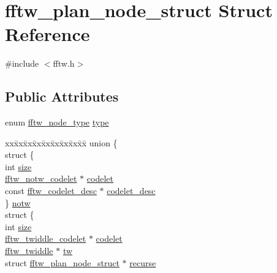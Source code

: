 \hypertarget{structfftw__plan__node__struct}{\section{fftw\-\_\-plan\-\_\-node\-\_\-struct Struct Reference}
\label{structfftw__plan__node__struct}
}


{\ttfamily \#include $<$fftw.\-h$>$}

\subsection*{Public Attributes}
\begin{DoxyCompactItemize}
\item 
enum \hyperlink{fftw_8h_a62ecac3f39269a2efca878ca819349f1}{fftw\-\_\-node\-\_\-type} \hyperlink{structfftw__plan__node__struct_a726e9ec82efd03cdc7b8be71c0c7225f}{type}
\item 
\begin{tabbing}
xx\=xx\=xx\=xx\=xx\=xx\=xx\=xx\=xx\=\kill
union \{\\
\>struct \{\\
\>\>int \hyperlink{structfftw__plan__node__struct_a334e1fcc2c98575d85d9a951b9e95941}{size}\\
\>\>\hyperlink{fftw_8h_a20c8a8b382f86bd89bf9c317cb95ec87}{fftw\_notw\_codelet} $\ast$ \hyperlink{structfftw__plan__node__struct_a25c03594d9b1cbb6233d09b3bc0af418}{codelet}\\
\>\>const \hyperlink{structfftw__codelet__desc}{fftw\_codelet\_desc} $\ast$ \hyperlink{structfftw__plan__node__struct_a7cb707dc27fb4779fbd0ee9cb4d7efd9}{codelet\_desc}\\
\>\} \hyperlink{structfftw__plan__node__struct_a1a913686c2edbeca067fff5c70838dd8}{notw}\\
\>struct \{\\
\>\>int \hyperlink{structfftw__plan__node__struct_a334e1fcc2c98575d85d9a951b9e95941}{size}\\
\>\>\hyperlink{fftw_8h_a79213ac601712388802d76366c1da781}{fftw\_twiddle\_codelet} $\ast$ \hyperlink{structfftw__plan__node__struct_a5974d49a3f2ae9c629156dbfc3effb20}{codelet}\\
\>\>\hyperlink{fftw_8h_a726c4a427d2f70038050e3048b783cb2}{fftw\_twiddle} $\ast$ \hyperlink{structfftw__plan__node__struct_a4a7244edea4157eb541d712ae30e2fab}{tw}\\
\>\>struct \hyperlink{structfftw__plan__node__struct}{fftw\_plan\_node\_struct} $\ast$ \hyperlink{structfftw__plan__node__struct_aa3ffc937d4b754addf7d17b18b313c70}{recurse}\\

\end{tabbing}
\end{DoxyCompactItemize}
